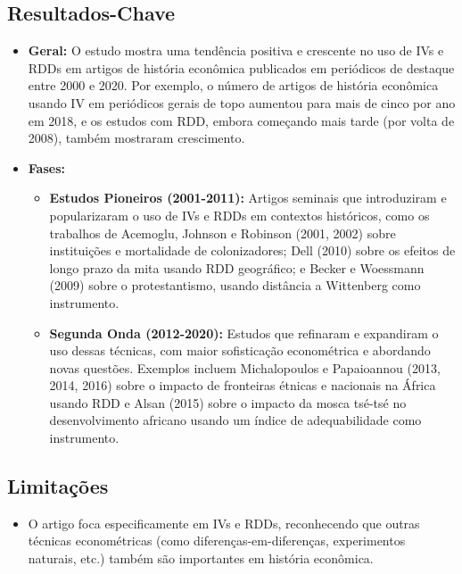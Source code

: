 \documentclass[12pt]{article}
\begin{document}
\subsection*{Resultados-Chave}
\begin{itemize}[leftmargin=*]
    \item \textbf{Geral:}
    O estudo mostra uma tendência positiva e crescente no uso de IVs e RDDs em artigos de história econômica publicados em periódicos de destaque entre 2000 e 2020. Por exemplo, o número de artigos de história econômica usando IV em periódicos gerais de topo aumentou para mais de cinco por ano em 2018, e os estudos com RDD, embora começando mais tarde (por volta de 2008), também mostraram crescimento.
    
    \item \textbf{Fases:}
    \begin{itemize}
        \item \textbf{Estudos Pioneiros (2001-2011):} Artigos seminais que introduziram e popularizaram o uso de IVs e RDDs em contextos históricos, como os trabalhos de Acemoglu, Johnson e Robinson (2001, 2002) sobre instituições e mortalidade de colonizadores; Dell (2010) sobre os efeitos de longo prazo da mita usando RDD geográfico; e Becker e Woessmann (2009) sobre o protestantismo, usando distância a Wittenberg como instrumento.
        \item \textbf{Segunda Onda (2012-2020):} Estudos que refinaram e expandiram o uso dessas técnicas, com maior sofisticação econométrica e abordando novas questões. Exemplos incluem Michalopoulos e Papaioannou (2013, 2014, 2016) sobre o impacto de fronteiras étnicas e nacionais na África usando RDD e Alsan (2015) sobre o impacto da mosca tsé-tsé no desenvolvimento africano usando um índice de adequabilidade como instrumento.
    \end{itemize}
\end{itemize}

\subsection*{Limitações}
\begin{itemize}[leftmargin=*]
    \item O artigo foca especificamente em IVs e RDDs, reconhecendo que outras técnicas econométricas (como diferenças-em-diferenças, experimentos naturais, etc.) também são importantes em história econômica.
\end{itemize}
\end{document}
